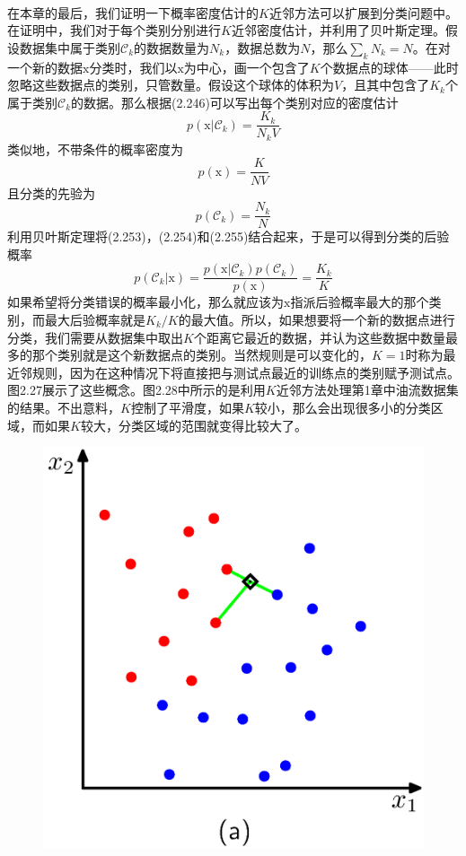 \documentclass[b5paper]{book}
\numberwithin{equation}{chapter}
\newcommand {\bx} {\boldsymbol{\mathrm{x}}}
\begin{document}
{	\\
	\indent 在本章的最后，我们证明一下概率密度估计的$K$近邻方法可以扩展到分类问题中。在证明中，我们对于每个类别分别进行$K$近邻密度估计，并利用了贝叶斯定理。假设数据集中属于类别$\mathcal{C}_k$的数据数量为$N_k$，数据总数为$N$，那么$\sum_k N_k =N$。在对一个新的数据$\bx$分类时，我们以$\bx$为中心，画一个包含了$K$个数据点的球体——此时忽略这些数据点的类别，只管数量。假设这个球体的体积为$V$，且其中包含了$K_k$个属于类别$\mathcal{C}_k$的数据。那么根据(2.246)可以写出每个类别对应的密度估计
	\begin{equation}
		p(\bx|\mathcal{C}_k)=\frac{K_k}{N_k V}
	\end{equation}
	类似地，不带条件的概率密度为
	\begin{equation}
		p(\bx)=\frac{K}{NV}
	\end{equation}
	且分类的先验为
	\begin{equation}
		p(\mathcal{C}_k)=\frac{N_k}{N}
	\end{equation}
	利用贝叶斯定理将(2.253)，(2.254)和(2.255)结合起来，于是可以得到分类的后验概率
	\begin{equation}
		p(\mathcal{C}_k|\bx)=\frac{p(\bx|\mathcal{C}_k)p(\mathcal{C}_k)}{p(\bx)} = \frac{K_k}{K}
	\end{equation}
	\indent 如果希望将分类错误的概率最小化，那么就应该为$\bx$指派后验概率最大的那个类别，而最大后验概率就是$K_k/K$的最大值。所以，如果想要将一个新的数据点进行分类，我们需要从数据集中取出$K$个距离它最近的数据，并认为这些数据中数量最多的那个类别就是这个新数据点的类别。当然规则是可以变化的，$K=1$时称为最近邻规则，因为在这种情况下将直接把与测试点最近的训练点的类别赋予测试点。图2.27展示了这些概念。图2.28中所示的是利用$K$近邻方法处理第1章中油流数据集的结果。不出意料，$K$控制了平滑度，如果$K$较小，那么会出现很多小的分类区域，而如果$K$较大，分类区域的范围就变得比较大了。
	\begin{figure}[ht]
		\begin{minipage}[t]{0.5\linewidth}
		\centering
		\includegraphics[scale=0.8]{Images/2-27a.png}

\end{minipage}
\end{figure}}
\end{document}
